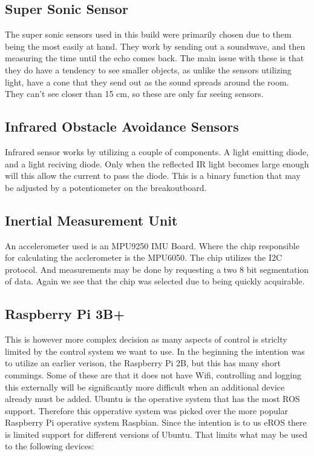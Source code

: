 \subsection{Super Sonic Sensor}
The super sonic sensors used in this build were primarily chosen due to them being the most easily at hand. They work by sending out a soundwave, and
then measuring the time until the echo comes back. The main issue with these is that they do have a tendency to see smaller objects, as unlike
the sensors utilizing light, have a cone that they send out as the sound spreads around the room. They can't see closer than 15 cm, so these are only
far seeing sensors. 

\subsection{Infrared Obstacle Avoidance Sensors}
Infrared sensor works by utilizing a couple of components. A light emitting diode, and a light reciving diode. Only when the reflected IR light
becomes large enough will this allow the current to pass the diode. This is a binary  function that may be adjusted by a potentiometer on the 
breakoutboard.


\subsection{Inertial Measurement Unit}
An accelerometer used is an  MPU9250 IMU Board. Where the chip responsible for calculating the acclerometer is the MPU6050. The chip utilizes the I2C
protocol. And measurements may be done by requesting a two 8 bit segmentation of data. Again we see that the chip was selected due to being 
quickly acquirable.


\subsection{Raspberry Pi 3B+}
This is however more complex decision as many aspects of control is striclty limited by the control system we want to use. In the beginning the
intention was to utilize an earlier verison, the Raspberry Pi 2B, but this has many short commings. Some of these are that it does not have Wifi,
controlling and logging this externally will be significantly more difficult when an additional device already must be added. Ubuntu is the operative
system that has the most ROS support. Therefore this opperative system was picked over the more popular Raspberry Pi operative system Raspbian. Since 
the intention is to us eROS there is limited support for different versions of Ubuntu. That limits what may be used to the following devices:


